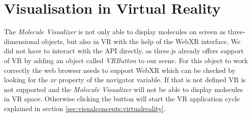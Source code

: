 \section{Visualisation in Virtual Reality}
\label{sec:implementation:visualvr}

The \textit{Molecule Visualizer} is not only able to display molecules on screen as three-dimensional objects, but also in VR with the help of the WebXR interface. We did not have to interact with the API directly, as three.js already offers support of VR by adding an object called \textit{VRButton} to our scene. For this object to work correctly the web browser needs to support WebXR which can be checked by looking for the \textit{xr} property of the navigator variable. If that is not defined VR is not supported and the \textit{Molecule Visualizer} will not be able to display molecules in VR space. Otherwise clicking the button will start the VR application cycle explained in section \ref{sec:visualconcepts:virtualreality}.

